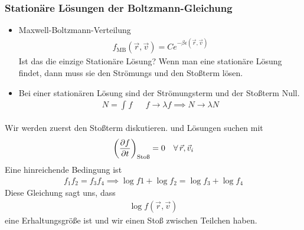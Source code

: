 \subsubsection*{Stationäre Lösungen der Boltzmann-Gleichung}
\begin{itemize}
  \item Maxwell-Boltzmann-Verteilung
    \begin{align*}
      f_\text{MB}(\vec{r}, \vec{v}) = C e^{-\beta \epsilon(\vec{r},\vec{v})}
    \end{align*}
    Ist das die einzige Stationäre Lösung? Wenn man eine stationäre Lösung
    findet, dann muss sie den Strömungs und den Stoßterm lösen.
  \item
    Bei einer stationären Lösung sind der Strömungsterm und
    der Stoßterm Null.
    \begin{align*}
      N = \int_{}^{} f && f\to \lambda f \implies N \to \lambda N
    \end{align*}
    
\end{itemize}
Wir werden zuerst den Stoßterm diskutieren. und Lösungen suchen mit
%
\begin{align*}
  \left( \frac{\partial f }{\partial t} \right)_\text{Stoß} = 0 \quad\forall\,\vec{r}, \vec{v}_i
\end{align*}
%
Eine hinreichende Bedingung ist
%
\begin{align*}
  f_1 f_2 = f_3 f_4 \implies \log{f1} + \log{f_2} = \log{f_3} + \log{f_4}
\end{align*}
%
Diese Gleichung sagt uns, dass %
\begin{align*}
  \log{f(\vec{r},\vec{v})}
\end{align*}
%
eine Erhaltungsgröße ist und wir einen Stoß zwischen Teilchen haben.

